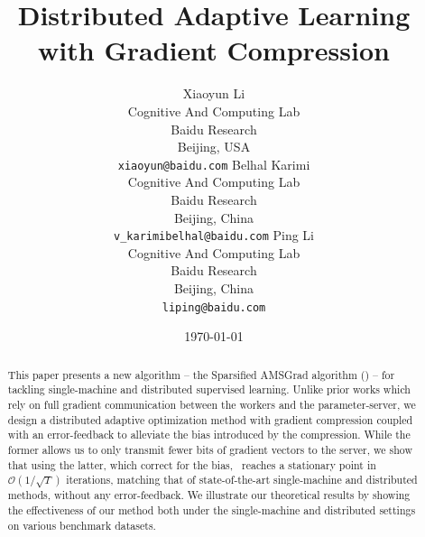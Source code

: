 \documentclass[11pt]{article}
\begin{document}
\title{Distributed Adaptive Learning with Gradient Compression}

\author{
Xiaoyun Li \\
  Cognitive And Computing Lab\\
  Baidu Research\\
  Beijing, USA \\
  \texttt{xiaoyun@baidu.com} 
   \And
  Belhal Karimi \\
  Cognitive And Computing Lab\\
  Baidu Research\\
  Beijing, China \\
  \texttt{v_karimibelhal@baidu.com} 
   \And
  Ping Li \\
  Cognitive And Computing Lab\\
  Baidu Research\\
  Beijing, China \\
  \texttt{liping@baidu.com} \\
}

\date{\today}

\maketitle

\begin{abstract}
This paper presents a new algorithm -- the Sparsified AMSGrad algorithm (\algo) -- for tackling single-machine and distributed supervised learning.
Unlike prior works which rely on full gradient communication between the workers and the parameter-server, we design a distributed adaptive optimization method with gradient compression coupled with an error-feedback to alleviate the bias introduced by the compression.
While the former allows us to only transmit fewer bits of gradient vectors to the server, we show that using the latter, which correct for the bias, \algo\ reaches a stationary point in $\mathcal{O}(1/ \sqrt{T})$ iterations, matching that of state-of-the-art single-machine and distributed methods, without any error-feedback.
We illustrate our theoretical results by showing the effectiveness of our method both under the single-machine and distributed settings on various benchmark datasets.
\end{abstract}
\end{document}

